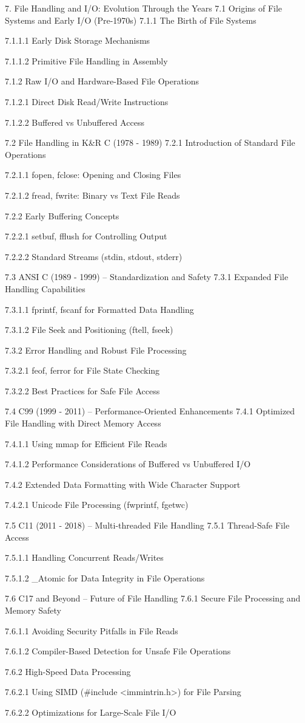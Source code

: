 7. File Handling and I/O: Evolution Through the Years
7.1 Origins of File Systems and Early I/O (Pre-1970s)
7.1.1 The Birth of File Systems

7.1.1.1 Early Disk Storage Mechanisms

7.1.1.2 Primitive File Handling in Assembly

7.1.2 Raw I/O and Hardware-Based File Operations

7.1.2.1 Direct Disk Read/Write Instructions

7.1.2.2 Buffered vs Unbuffered Access

7.2 File Handling in K&R C (1978 - 1989)
7.2.1 Introduction of Standard File Operations

7.2.1.1 fopen, fclose: Opening and Closing Files

7.2.1.2 fread, fwrite: Binary vs Text File Reads

7.2.2 Early Buffering Concepts

7.2.2.1 setbuf, fflush for Controlling Output

7.2.2.2 Standard Streams (stdin, stdout, stderr)

7.3 ANSI C (1989 - 1999) – Standardization and Safety
7.3.1 Expanded File Handling Capabilities

7.3.1.1 fprintf, fscanf for Formatted Data Handling

7.3.1.2 File Seek and Positioning (ftell, fseek)

7.3.2 Error Handling and Robust File Processing

7.3.2.1 feof, ferror for File State Checking

7.3.2.2 Best Practices for Safe File Access

7.4 C99 (1999 - 2011) – Performance-Oriented Enhancements
7.4.1 Optimized File Handling with Direct Memory Access

7.4.1.1 Using mmap for Efficient File Reads

7.4.1.2 Performance Considerations of Buffered vs Unbuffered I/O

7.4.2 Extended Data Formatting with Wide Character Support

7.4.2.1 Unicode File Processing (fwprintf, fgetwc)

7.5 C11 (2011 - 2018) – Multi-threaded File Handling
7.5.1 Thread-Safe File Access

7.5.1.1 Handling Concurrent Reads/Writes

7.5.1.2 _Atomic for Data Integrity in File Operations

7.6 C17 and Beyond – Future of File Handling
7.6.1 Secure File Processing and Memory Safety

7.6.1.1 Avoiding Security Pitfalls in File Reads

7.6.1.2 Compiler-Based Detection for Unsafe File Operations

7.6.2 High-Speed Data Processing

7.6.2.1 Using SIMD (#include <immintrin.h>) for File Parsing

7.6.2.2 Optimizations for Large-Scale File I/O

